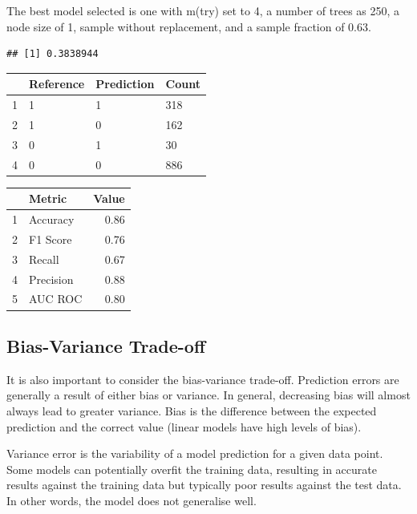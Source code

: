 \documentclass[11pt,preprint, authoryear]{elsarticle}
\let\origtable\table
\let\endorigtable\endtable
\renewenvironment{table}[1][2] {
    \expandafter\origtable\expandafter[H]
} {
    \endorigtable
}
\numberwithin{equation}{section}
\numberwithin{figure}{section}
\numberwithin{table}{section}
\begin{document}
The best model selected is one with m(try) set to 4, a number of trees
as 250, a node size of 1, sample without replacement, and a sample
fraction of 0.63.

\begin{verbatim}
## [1] 0.3838944
\end{verbatim}

\begin{table}[H]
\centering
\begin{tabular}{rlll}
  \hline
 & Reference & Prediction & Count \\ 
  \hline
1 & 1 & 1 & 318 \\ 
  2 & 1 & 0 & 162 \\ 
  3 & 0 & 1 &  30 \\ 
  4 & 0 & 0 & 886 \\ 
   \hline
\end{tabular}
\caption{Confusion Matrix for Tuned Random Forest \label{tab1}} 
\end{table}

\begin{table}[H]
\centering
\begin{tabular}{rlr}
  \hline
 & Metric & Value \\ 
  \hline
1 & Accuracy & 0.86 \\ 
  2 & F1 Score & 0.76 \\ 
  3 & Recall & 0.67 \\ 
  4 & Precision & 0.88 \\ 
  5 & AUC ROC & 0.80 \\ 
   \hline
\end{tabular}
\caption{Metrics for Tuned Random Forest \label{tab1}} 
\end{table}

\hypertarget{bias-variance-trade-off}{%
\subsection*{Bias-Variance Trade-off}\label{bias-variance-trade-off}}

It is also important to consider the bias-variance trade-off. Prediction
errors are generally a result of either bias or variance. In general,
decreasing bias will almost always lead to greater variance. Bias is the
difference between the expected prediction and the correct value (linear
models have high levels of bias).

Variance error is the variability of a model prediction for a given data
point. Some models can potentially overfit the training data, resulting
in accurate results against the training data but typically poor results
against the test data. In other words, the model does not generalise
well.
\end{document}
